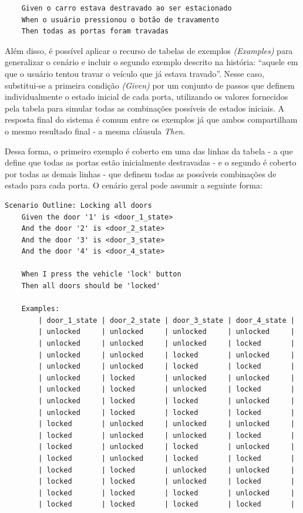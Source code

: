\begin{verbatim}
    Given o carro estava destravado ao ser estacionado
    When o usuário pressionou o botão de travamento
    Then todas as portas foram travadas
\end{verbatim}

Além disso, é possível aplicar o recurso de tabelas de exemplos \textit{(Examples)} para generalizar o cenário e incluir o segundo exemplo descrito na história: ``aquele 
em que o usuário tentou travar o veículo que já estava travado''. Nesse caso, substitui-se a primeira condição \textit{(Given)} por um conjunto de passos que definem 
individualmente o estado inicial de cada porta, utilizando os valores fornecidos pela tabela para simular todas as combinações possíveis de estados iniciais. 
A resposta final do sistema é comum entre os exemplos já que ambos compartilham o mesmo resultado final - a mesma cláusula \textit{Then}. 

Dessa forma, o primeiro exemplo é coberto em uma das linhas da tabela - a que define que todas as portas estão inicialmente destravadas - e o segundo é coberto 
por todas as demais linhas - que definem todas as possíveis combinações de estado para cada porta. O cenário geral pode assumir a seguinte forma:

\begin{verbatim}
Scenario Outline: Locking all doors
    Given the door '1' is <door_1_state>
    And the door '2' is <door_2_state>
    And the door '3' is <door_3_state>
    And the door '4' is <door_4_state>

    When I press the vehicle 'lock' button
    Then all doors should be 'locked'

    Examples:
        | door_1_state | door_2_state | door_3_state | door_4_state |
        | unlocked     | unlocked     | unlocked     | unlocked     |
        | unlocked     | unlocked     | unlocked     | locked       |
        | unlocked     | unlocked     | locked       | unlocked     |
        | unlocked     | unlocked     | locked       | locked       |
        | unlocked     | locked       | unlocked     | unlocked     |
        | unlocked     | locked       | unlocked     | locked       |
        | unlocked     | locked       | locked       | unlocked     |
        | unlocked     | locked       | locked       | locked       |
        | locked       | unlocked     | unlocked     | unlocked     |
        | locked       | unlocked     | unlocked     | locked       |
        | locked       | unlocked     | locked       | unlocked     |
        | locked       | unlocked     | locked       | locked       |
        | locked       | locked       | unlocked     | unlocked     |
        | locked       | locked       | unlocked     | locked       |
        | locked       | locked       | locked       | unlocked     |
        | locked       | locked       | locked       | locked       |
\end{verbatim}

